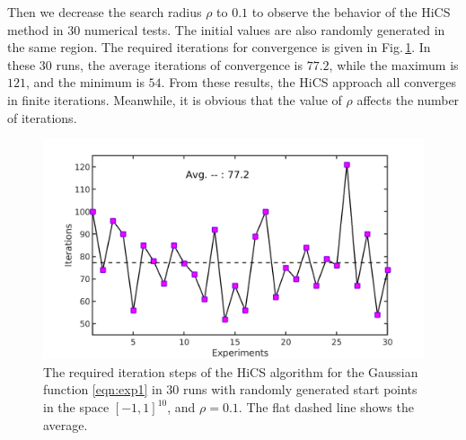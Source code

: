 \documentclass[final,1p,times]{elsarticle}
\begin{document}
Then we decrease the search radius $\rho$ to $0.1$ to observe the
behavior of the HiCS method in $30$ numerical tests. 
The initial values are also randomly generated in the same region.  
The required iterations for convergence is given in
Fig.\,\ref{fig:exp1:randInitr0_1}.
In these $30$ runs, the average iterations of convergence is
$77.2$, while the maximum is $121$, and the minimum is $54$.
From these results, the HiCS approach all converges in
finite iterations. Meanwhile, it is obvious that the value of
$\rho$ affects the number of iterations. 
\begin{figure}[!htbp]
	\centering
	  \includegraphics[scale=0.2]{../figures/gauss10Drandr0_1.png}
	  \caption{
	  The required iteration steps of the 
	  HiCS algorithm for the Gaussian function
	  \eqref{eqn:exp1} in $30$ runs with randomly generated start points
	  in the space $[-1, 1]^{10}$, and $\rho=0.1$. 
	  The flat dashed line shows the average.} 
	  \label{fig:exp1:randInitr0_1}
\end{figure}


\end{document}
